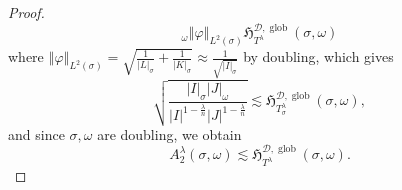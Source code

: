 \documentclass{amsart}%
\theoremstyle{plain}
\numberwithin{equation}{section}
\begin{document}
\begin{proof}
\[{_{\omega}}\left\Vert \varphi\right\Vert _{L^{2}\left(  \sigma\right)
}\mathfrak{H}_{T^{\lambda}}^{\mathcal{D},\operatorname*{glob}}\left(
\sigma,\omega\right)
\]
where $\left\Vert \varphi\right\Vert _{L^{2}\left(  \sigma\right)  }%
=\sqrt{\frac{1}{\left\vert L\right\vert _{\sigma}}+\frac{1}{\left\vert
K\right\vert _{\sigma}}}\approx\frac{1}{\sqrt{\left\vert I\right\vert
_{\sigma}}}$ by doubling, which gives
\[
\sqrt{\frac{\left\vert I\right\vert _{\sigma}\left\vert J\right\vert _{\omega
}}{\left\vert I\right\vert ^{1-\frac{\lambda}{n}}\left\vert J\right\vert
^{1-\frac{\lambda}{n}}}}\lesssim\mathfrak{H}_{T_{\sigma}^{\lambda}%
}^{\mathcal{D},\operatorname*{glob}}\left(  \sigma,\omega\right)  ,
\]
and since $\sigma,\omega$ are doubling, we obtain%
\[
A_{2}^{\lambda}\left(  \sigma,\omega\right)  \lesssim\mathfrak{H}_{T^{\lambda
}}^{\mathcal{D},\operatorname*{glob}}\left(  \sigma,\omega\right)  .
\]



\end{proof}
\end{document}
